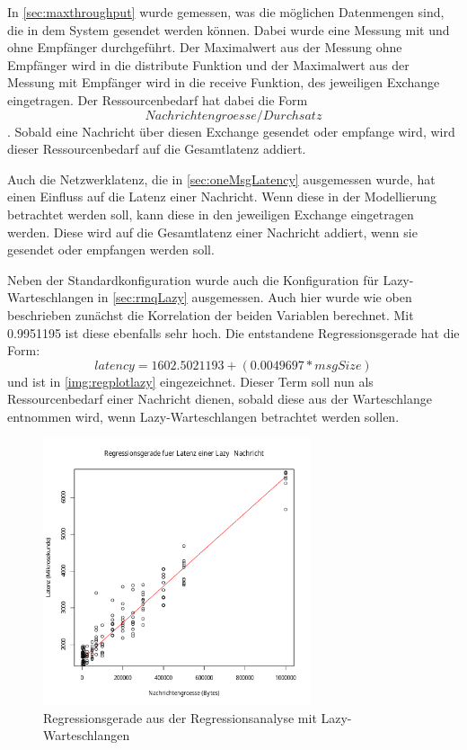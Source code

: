 \par

In \autoref{sec:maxthroughput} wurde gemessen, was die möglichen Datenmengen sind, die in dem System gesendet werden können. Dabei wurde eine Messung mit und ohne Empfänger durchgeführt. Der Maximalwert aus der Messung ohne Empfänger wird in die distribute Funktion und der Maximalwert aus der Messung mit Empfänger wird in die receive Funktion, des jeweiligen Exchange eingetragen. Der Ressourcenbedarf hat dabei die Form \[Nachrichtengroesse /  Durchsatz\]. Sobald eine Nachricht über diesen Exchange gesendet oder empfange wird, wird dieser Ressourcenbedarf auf die Gesamtlatenz addiert. \par

Auch die Netzwerklatenz, die in \autoref{sec:oneMsgLatency} ausgemessen wurde, hat einen Einfluss auf die Latenz einer Nachricht. Wenn diese in der Modellierung betrachtet werden soll, kann diese in den jeweiligen Exchange eingetragen werden. Diese wird auf die Gesamtlatenz einer Nachricht addiert, wenn sie gesendet oder empfangen werden soll. \par

Neben der Standardkonfiguration wurde auch die Konfiguration für Lazy-Warteschlangen in \autoref{sec:rmqLazy} ausgemessen. Auch hier wurde wie oben beschrieben zunächst die Korrelation der beiden Variablen berechnet. Mit 0.9951195 ist diese ebenfalls sehr hoch. Die entstandene Regressionsgerade hat die Form: \[latency = 1602.5021193 + (0.0049697 * msgSize)\] und ist in \autoref{img:regplotlazy} eingezeichnet. Dieser Term soll nun als Ressourcenbedarf einer Nachricht dienen, sobald diese aus der Warteschlange entnommen wird, wenn Lazy-Warteschlangen betrachtet werden sollen.
\begin{figure}
\center
  \includegraphics[width=0.7\textwidth]{images/modelling/oneMsgLazyRegression.pdf}
  \caption{Regressionsgerade aus der Regressionsanalyse mit Lazy-Warteschlangen}
  \label{img:regplotlazy}
\end{figure}


